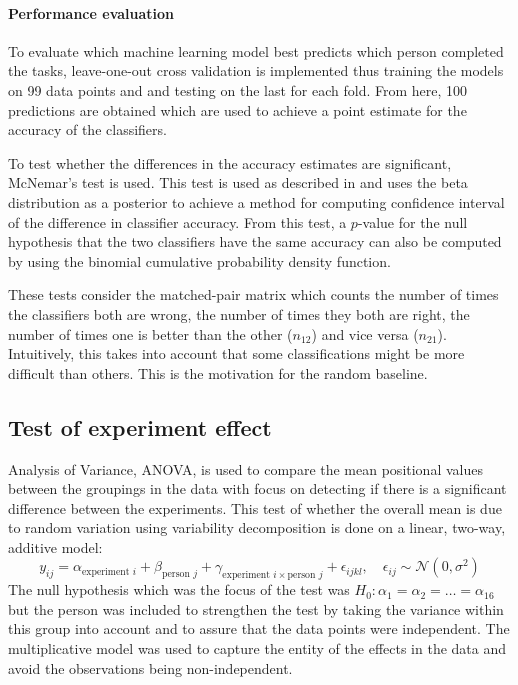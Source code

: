 \documentclass[11pt,fleqn]{article}
\begin{document}
\paragraph{Performance evaluation}
To evaluate which machine learning model best predicts which person completed the tasks, leave-one-out cross validation is implemented thus training the models on 99 data points and and testing on the last for each fold.
From here, 100 predictions are obtained which are used to achieve a point estimate for the accuracy of the classifiers.

To test whether the differences in the accuracy estimates are significant, McNemar's test is used. 
This test is used as described in \cite[Method 11.3.2]{Tue} and uses the beta distribution as a posterior to achieve a method for computing confidence interval of the difference in classifier accuracy.
From this test, a \(p\)-value for the null hypothesis that the two classifiers have the same accuracy can also be computed by using the binomial cumulative probability density function.

These tests consider the matched-pair matrix which counts the number of times the classifiers both are wrong, the number of times they both are right, the number of times one is better than the other (\(n_{12}\)) and vice versa (\(n_{21}\)).
Intuitively, this takes into account that some classifications might be more difficult than others. 
This is the motivation for the random baseline.


\subsection{Test of experiment effect}\label{subsec:expeffect}
Analysis of Variance, ANOVA, is used to compare the mean positional values between the groupings in the data with focus on detecting if there is a significant difference between the experiments.
This test of whether the overall mean is due to random variation using variability decomposition is done on a linear, two-way, additive model:
\[
	y_{ij} = \alpha_{\text{experiment } i}+
	\beta_{\text{person } j}+ 
	\gamma_{\text{experiment } i \times\text{person } j }
	+ \epsilon_{ijkl}, \quad \epsilon_{ij} \sim \mathcal N (0, \sigma^2)
\]
The null hypothesis which was the focus of the test was $ H_0: \alpha_1=\alpha_2=\ldots=\alpha_{16} $ but the person was included to strengthen the test by taking the variance within this group into account and to assure that the data points were independent. 
The multiplicative model was used to capture the entity of the effects in the data and avoid the observations being non-independent.
\end{document}

